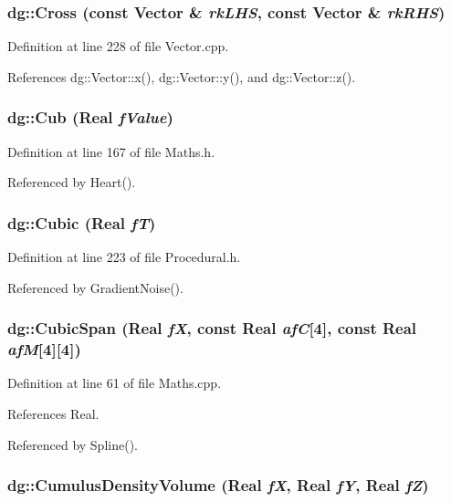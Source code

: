 \subsubsection{ dg::Cross (const {\bf Vector} \& {\em rk\-LHS}, const {\bf Vector} \& {\em rk\-RHS})}\label{namespacedg_a183}




Definition at line 228 of file Vector.cpp.

References dg::Vector::x(), dg::Vector::y(), and dg::Vector::z().
\subsubsection{ dg::Cub ({\bf Real} {\em f\-Value})\hspace{0.3cm}{\tt  [inline]}}\label{namespacedg_a98}




Definition at line 167 of file Maths.h.

Referenced by Heart().
\subsubsection{ dg::Cubic ({\bf Real} {\em f\-T})\hspace{0.3cm}{\tt  [inline]}}\label{namespacedg_a152}




Definition at line 223 of file Procedural.h.

Referenced by Gradient\-Noise().
\subsubsection{ dg::Cubic\-Span ({\bf Real} {\em f\-X}, const {\bf Real} {\em af\-C}[4], const {\bf Real} {\em af\-M}[4][4])}\label{namespacedg_a118}




Definition at line 61 of file Maths.cpp.

References Real.

Referenced by Spline().
\subsubsection{ dg::Cumulus\-Density\-Volume ({\bf Real} {\em f\-X}, {\bf Real} {\em f\-Y}, {\bf Real} {\em f\-Z})\hspace{0.3cm}{\tt  [inline]}}\label{namespacedg_a192}




